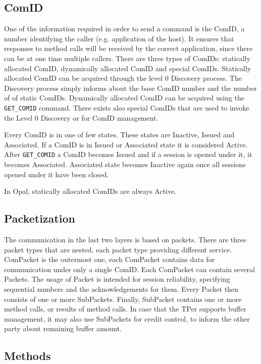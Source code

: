 \subsection{ComID}

One of the information required in order to send a command is the ComID, a number identifying the caller (e.g. application of the host). It ensures that responses to method calls will be received by the correct application, since there can be at one time multiple callers. 
There are three types of ComIDs: statically allocated ComID, dynamically allocated ComID and special ComIDs.
Statically allocated ComID can be acquired through the level 0 Discovery process. The Discovery process simply informs about the base ComID number and the number of of static ComIDs.
Dynamically allocated ComID can be acquired using the \verb|GET_COMID| command.
There exists also special ComIDs that are used to invoke the Level 0 Discovery or for ComID management.

Every ComID is in one of few states. These states are Inactive, Issued and Associated. If a ComID is in Issued or Associated state it is considered Active. After \verb|GET_COMID| a ComID becomes Issued and if a session is opened under it, it becomes Associated. Associated state becomes Inactive again once all sessions opened under it have been closed.

In Opal, statically allocated ComIDs are always Active.

\subsection{Packetization}

The communication in the last two layers is based on packets. There are three packet types that are nested, each packet type providing different service.
ComPacket is the outermost one, each ComPacket contains data for communication under only a single ComID. Each ComPacket can contain several Packets. The usage of Packet is intended for session reliability, specifying sequential numbers and the acknowledgements for them. Every Packet then consists of one or more SubPackets. Finally, SubPacket contains one or more method calls, or results of method calls. In case that the TPer supports buffer management, it may also use SubPackets for credit control, to inform the other party about remaining buffer amount.

\subsection{Methods}

